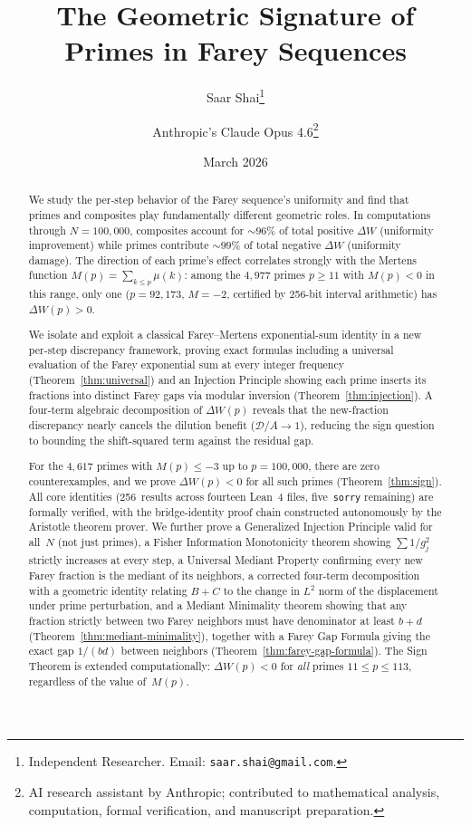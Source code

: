 \documentclass[11pt]{article}
\title{The Geometric Signature of Primes in Farey Sequences}
\author{
  Saar Shai\thanks{Independent Researcher. Email: \texttt{saar.shai@gmail.com}.}
  \and
  Anthropic's Claude Opus 4.6\thanks{AI research assistant by Anthropic; contributed to mathematical analysis, computation, formal verification, and manuscript preparation.}
}
\date{March 2026}
\theoremstyle{definition}
\begin{document}
\maketitle

\begin{abstract}
We study the per-step behavior of the Farey sequence's uniformity
and find that primes and composites play fundamentally different
geometric roles.  In computations through $N = 100{,}000$,
composites account for ${\sim}96\%$ of total positive $\Delta W$
(uniformity improvement) while primes contribute ${\sim}99\%$ of
total negative $\Delta W$ (uniformity damage).  The direction of
each prime's effect correlates strongly with the Mertens function
$M(p) = \sum_{k \le p} \mu(k)$: among the $4{,}977$ primes
$p \ge 11$ with $M(p) < 0$ in this range, only one
($p = 92{,}173$, $M = -2$, certified by 256-bit interval
arithmetic) has $\Delta W(p) > 0$.

We isolate and exploit a classical Farey--Mertens exponential-sum
identity in a new per-step discrepancy framework, proving exact
formulas including a universal evaluation of the Farey exponential
sum at every integer frequency
(Theorem~\ref{thm:universal}) and an Injection Principle showing
each prime inserts its fractions into distinct Farey gaps via
modular inversion (Theorem~\ref{thm:injection}).
A four-term algebraic decomposition of $\Delta W(p)$ reveals
that the new-fraction discrepancy nearly cancels the dilution
benefit ($\mathcal{D}/A \to 1$), reducing the sign question to
bounding the shift-squared term against the residual gap.

For the $4{,}617$ primes with $M(p) \le -3$ up to
$p = 100{,}000$, there are zero counterexamples, and we prove
$\Delta W(p) < 0$ for all such primes
(Theorem~\ref{thm:sign}).
All core identities (256~results across fourteen Lean~4 files,
five~\texttt{sorry} remaining) are formally verified, with the
bridge-identity proof chain constructed autonomously by the
Aristotle theorem prover.  We further prove a Generalized
Injection Principle valid for all~$N$ (not just primes), a
Fisher Information Monotonicity theorem showing
$\sum 1/g_j^2$ strictly increases at every step, a
Universal Mediant Property confirming every new Farey fraction
is the mediant of its neighbors, a corrected four-term
decomposition with a geometric identity relating $B+C$ to the
change in $L^2$ norm of the displacement under prime perturbation,
and a Mediant Minimality theorem showing that any fraction
strictly between two Farey neighbors must have denominator at
least $b+d$ (Theorem~\ref{thm:mediant-minimality}), together
with a Farey Gap Formula giving the exact gap $1/(bd)$
between neighbors (Theorem~\ref{thm:farey-gap-formula}).
The Sign Theorem is extended computationally:
$\Delta W(p) < 0$ for \emph{all} primes $11 \le p \le 113$,
regardless of the value of~$M(p)$.
\end{abstract}
\end{document}
